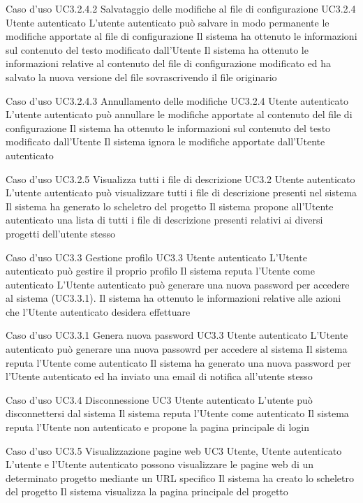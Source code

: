 \UCtitle
{Caso d'uso UC3.2.4.2}  
{Salvataggio delle modifiche al file di configurazione}	
\UC	
{UC3.2.4}		
{Utente autenticato}
{L'utente autenticato può salvare in modo permanente le modifiche apportate al file di configurazione}
{Il sistema ha ottenuto le informazioni sul contenuto del testo modificato dall'Utente}
\post
{Il sistema ha ottenuto le informazioni relative al contenuto del file di configurazione modificato ed ha salvato la nuova versione del file sovrascrivendo il file originario}

\UCtitle
{Caso d'uso UC3.2.4.3}  
{Annullamento delle modifiche}	
\UC	
{UC3.2.4}		
{Utente autenticato}
{L'utente autenticato può annullare le modifiche apportate al contenuto del file di configurazione}
{Il sistema ha ottenuto le informazioni sul contenuto del testo modificato dall'Utente}
\post
{Il sistema ignora le modifiche apportate dall'Utente autenticato}

\UCtitle
{Caso d'uso UC3.2.5}  
{Visualizza tutti i file di descrizione}	
\UC	
{UC3.2}		
{Utente autenticato}
{L'utente autenticato può visualizzare tutti i file di descrizione presenti nel sistema}
{Il sistema ha generato lo scheletro del progetto}
\post
{Il sistema propone all'Utente autenticato una lista di tutti i file di descrizione presenti relativi ai diversi progetti dell'utente stesso}


\UCtitle
{Caso d'uso UC3.3}  
{Gestione profilo}
\UC		
{UC3.3}		
{Utente autenticato}
{L'Utente autenticato può gestire il proprio profilo}
{Il sistema reputa l'Utente come autenticato}
\scenario
{L'Utente autenticato può generare una nuova password per accedere al sistema (UC3.3.1).}
\post
{Il sistema ha ottenuto le informazioni relative alle azioni che l'Utente autenticato desidera effettuare}

\UCtitle
{Caso d'uso UC3.3.1}  
{Genera nuova password}		
\UC
{UC3.3}		
{Utente autenticato}
{L'Utente autenticato può generare una nuova passowrd per accedere al sistema}
{Il sistema reputa l'Utente come autenticato}
\post
{Il sistema ha generato una nuova password per l'Utente autenticato ed ha inviato una email di notifica all'utente stesso}

\UCtitle
{Caso d'uso UC3.4}  
{Disconnessione}
\UC		
{UC3}		
{Utente autenticato}
{L'utente può disconnettersi dal sistema}
{Il sistema reputa l'Utente come autenticato}
\post
{Il sistema reputa l'Utente non autenticato e propone la pagina principale di login}


\UCtitle
{Caso d'uso UC3.5}  
{Visualizzazione pagine web}
\UC		
{UC3}		
{Utente, Utente autenticato}
{L'utente e l'Utente autenticato possono visualizzare le pagine web di un determinato progetto mediante un URL specifico}
{Il sistema ha creato lo scheletro del progetto}
\post
{Il sistema visualizza la pagina principale del progetto}


